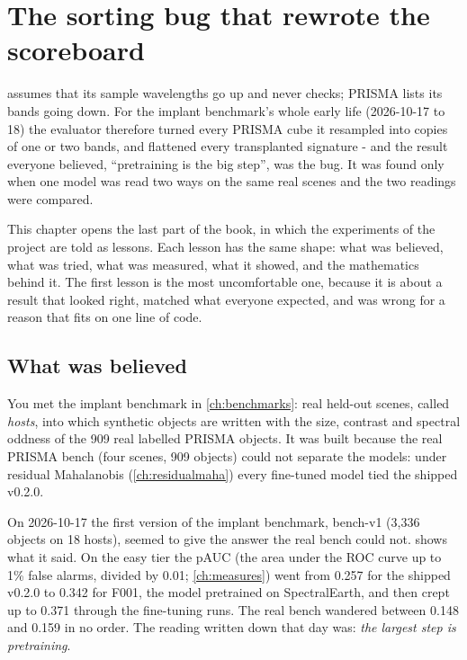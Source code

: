 \chapter{The sorting bug that rewrote the scoreboard}\label{ch:sortbug}
\begingroup\sloppy %

\begin{onething}
 assumes that its sample wavelengths go up and never checks; PRISMA lists its bands going
down. For the implant benchmark's whole early life (2026-10-17 to 18) the evaluator therefore turned every
PRISMA cube it resampled into copies of one or two bands, and flattened every transplanted signature - and the
result everyone believed, ``pretraining is the big step'', was the bug. It was found only when one model was
read two ways on the same real scenes and the two readings were compared.
\end{onething}

This chapter opens the last part of the book, in which the experiments of the project are told as lessons.
Each lesson has the same shape: what was believed, what was tried, what was measured, what it showed, and
the mathematics behind it. The first lesson is the most uncomfortable one, because it is about a result that
looked right, matched what everyone expected, and was wrong for a reason that fits on one line of code.

\section{What was believed}\label{sec:sortbug:believed}

You met the implant benchmark in \cref{ch:benchmarks}: real held-out scenes, called \emph{hosts}, into which
synthetic objects are written with the size, contrast and spectral oddness of the 909 real labelled PRISMA
objects. It was built because the real PRISMA bench (four scenes, 909 objects) could not separate the models:
under residual Mahalanobis (\cref{ch:residualmaha}) every fine-tuned model tied the shipped v0.2.0.

On 2026-10-17 the first version of the implant benchmark, bench-v1 (3,336 objects on 18 hosts),
seemed to give the answer the real bench could not.  shows what it said. On the
easy tier the pAUC (the area under the ROC curve up to 1\% false alarms, divided by 0.01; \cref{ch:measures})
went from 0.257 for the shipped v0.2.0 to 0.342 for F001, the model pretrained on SpectralEarth, and then
crept up to 0.371 through the fine-tuning runs. The
real bench wandered between 0.148 and 0.159 in no order. The reading written down that day was:
\emph{the largest step is pretraining}.

